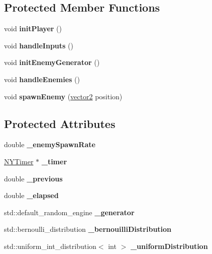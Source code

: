 \subsection*{Protected Member Functions}
\begin{DoxyCompactItemize}
\item 
\hypertarget{class_game_a405c0bb8156590c93304f11cf1f08065}{}\label{class_game_a405c0bb8156590c93304f11cf1f08065} 
void {\bfseries init\+Player} ()
\item 
\hypertarget{class_game_ab6ac1ec04e03f55c0af1d4f9d0540cc7}{}\label{class_game_ab6ac1ec04e03f55c0af1d4f9d0540cc7} 
void {\bfseries handle\+Inputs} ()
\item 
\hypertarget{class_game_a8e042746fe9490afb380d6bddcfbe140}{}\label{class_game_a8e042746fe9490afb380d6bddcfbe140} 
void {\bfseries init\+Enemy\+Generator} ()
\item 
\hypertarget{class_game_a14753444a9131fdd5985443584b05b08}{}\label{class_game_a14753444a9131fdd5985443584b05b08} 
void {\bfseries handle\+Enemies} ()
\item 
\hypertarget{class_game_a2e05059d70edc32d1d37a9fc1c179b86}{}\label{class_game_a2e05059d70edc32d1d37a9fc1c179b86} 
void {\bfseries spawn\+Enemy} (\hyperlink{structvector2}{vector2} position)
\end{DoxyCompactItemize}
\subsection*{Protected Attributes}
\begin{DoxyCompactItemize}
\item 
\hypertarget{class_game_a24743764a183ce755b12282940d5aa9d}{}\label{class_game_a24743764a183ce755b12282940d5aa9d} 
double {\bfseries \+\_\+enemy\+Spawn\+Rate}
\item 
\hypertarget{class_game_a28155935797d67083587e848effc1eb8}{}\label{class_game_a28155935797d67083587e848effc1eb8} 
\hyperlink{class_n_y_timer}{N\+Y\+Timer} $\ast$ {\bfseries \+\_\+timer}
\item 
\hypertarget{class_game_a4bcab81144d9676362e8e964337e43a1}{}\label{class_game_a4bcab81144d9676362e8e964337e43a1} 
double {\bfseries \+\_\+previous}
\item 
\hypertarget{class_game_a546c6124b218181cac529da2bcf47de4}{}\label{class_game_a546c6124b218181cac529da2bcf47de4} 
double {\bfseries \+\_\+elapsed}
\item 
\hypertarget{class_game_a82b8447c7ca1d8a6114f97fb15bbcc00}{}\label{class_game_a82b8447c7ca1d8a6114f97fb15bbcc00} 
std\+::default\+\_\+random\+\_\+engine {\bfseries \+\_\+generator}
\item 
\hypertarget{class_game_a7731391cbc79c28c8fbecf3ee4bf5ca5}{}\label{class_game_a7731391cbc79c28c8fbecf3ee4bf5ca5} 
std\+::bernoulli\+\_\+distribution {\bfseries \+\_\+bernouilli\+Distribution}
\item 
\hypertarget{class_game_a20a7cd8706d26ec0c45bbe52f84b2e81}{}\label{class_game_a20a7cd8706d26ec0c45bbe52f84b2e81} 
std\+::uniform\+\_\+int\+\_\+distribution$<$ int $>$ {\bfseries \+\_\+uniform\+Distribution}
\end{DoxyCompactItemize}


